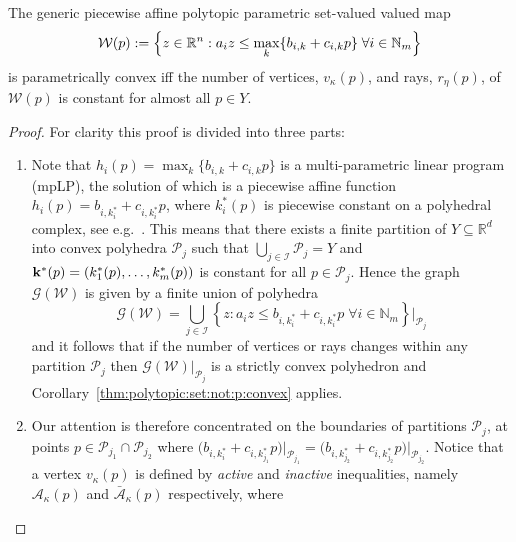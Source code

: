 \documentclass[smallextended]{svjour3}       %
\numberwithin{equation}{section}
\begin{document}
%
\begin{corollary}\label{thm:p:convexity:PWA:set:constant:num:verts}
The generic piecewise affine polytopic parametric set-valued valued map 
%
\begin{equation}\label{eq:definition:PWA:polytopic:set:general}
  \mathcal W(p) := \Bigl\{z\in\mathbb R^n: a_i z \leq \max_{k}\{b_{i,k} + c_{i,k}p\} \; \forall i\in\mathbb N_m \Bigr\}
\end{equation}
%
is parametrically convex iff the number of vertices, $v_\kappa(p)$, and rays, $r_\eta(p)$, of~$\mathcal W(p)$ is constant for almost all $p\in Y$.
\end{corollary}
%
\begin{proof}
For clarity this proof is divided into three parts:
\begin{enumerate}
\item Note that $h_i(p) = \max_{k} \{b_{i,k} + c_{i,k}p\}$ is a multi-parametric linear program (mpLP),
the solution of which is a piecewise affine function $h_i(p) = b_{i,k^\ast_i} + c_{i,k^\ast_i}p$, where $k^\ast_i(p)$ is piecewise constant on a polyhedral complex, see e.g.~\cite{spjotvold:2005}.
%
This means that there exists a finite partition of $Y\subseteq\mathbb R^d$ into convex polyhedra 
$\mathcal P_j$ such that $\bigcup_{j\in\mathcal I} \mathcal P_j = Y$ and 
${\bf{k}}^\ast(p) = (k_1^\ast(p),\dots,k_m^\ast(p))$ is constant for all $p \in \mathcal P_j$.
%
Hence the graph $\mathscr G(\mathcal W)$ is given by a finite union of polyhedra
%
\begin{equation*}
  \mathscr G(\mathcal W) = \bigcup_{j\in\mathcal I} \left\{z: a_i z \leq b_{i,k_i^\ast} + c_{i,k_i^\ast}p \; \forall i \in\mathbb N_m \right\}\bigr\vert_{\mathcal P_{j}}
\end{equation*}
%
and it follows that if the number of vertices or rays changes within any partition $\mathcal P_j$ then $\mathscr
G(\mathcal W)\vert_{\mathcal P_j}$ is a strictly convex polyhedron and Corollary~\ref{thm:polytopic:set:not:p:convex} applies.
%
\item Our attention is therefore concentrated on the boundaries of partitions $\mathcal P_j$, at points $p\in\mathcal P_{j_1} \cap \mathcal P_{j_2}$ where 
$\bigl(b_{i,k_i^\ast} + c_{i,k_{j_1}^\ast} p\bigr)\bigr\rvert_{\mathcal P_{j_1}} = 
\bigl(b_{i,k_{j_2}^\ast} + c_{i,k_{j_2}^\ast} p\bigr)\bigr\rvert_{\mathcal P_{j_2}}$.
%
Notice that a vertex $v_\kappa(p)$ is defined by \emph{active} and \emph{inactive} inequalities, namely $\mathcal A_\kappa(p)$ and
$\bar{\mathcal A}_\kappa(p)$ respectively, where

\end{enumerate}
\end{proof}
\end{document}
